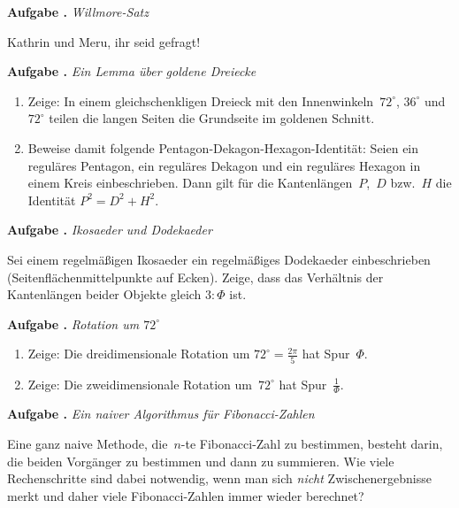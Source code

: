 \documentclass[a4paper,ngerman]{scrartcl}
\newlength{\aufgabenskip}
\newcounter{aufgabennummer}
\newenvironment{aufgabe}[1]{
  \addtocounter{aufgabennummer}{1}
  \textbf{Aufgabe \theaufgabennummer.} \emph{#1} \par
}{\vspace{\aufgabenskip}}
\begin{document}
\begin{aufgabe}{Willmore-Satz}
Kathrin und Meru, ihr seid gefragt!
\end{aufgabe}

\begin{aufgabe}{Ein Lemma über goldene Dreiecke}
\begin{enumerate}
\item Zeige: In einem gleichschenkligen Dreieck mit den
Innenwinkeln~$72^\circ$, $36^\circ$ und~$72^\circ$ teilen die langen Seiten die
Grundseite im goldenen Schnitt.
\item Beweise damit folgende Pentagon-Dekagon-Hexagon-Identität: Seien ein
reguläres Pentagon, ein reguläres Dekagon und ein reguläres Hexagon in einem
Kreis einbeschrieben. Dann gilt für die Kantenlängen~$P$,~$D$ bzw.~$H$ die
Identität $P^2 = D^2 + H^2$.
\end{enumerate}
\end{aufgabe}

\begin{aufgabe}{Ikosaeder und Dodekaeder}
Sei einem regelmäßigen Ikosaeder ein regelmäßiges Dodekaeder einbeschrieben
(Seitenflächenmittelpunkte auf Ecken). Zeige, dass das Verhältnis der Kantenlängen
beider Objekte gleich $3:\Phi$ ist.
\end{aufgabe}

\begin{aufgabe}{Rotation um $72^\circ$}
\begin{enumerate}
\item Zeige: Die dreidimensionale Rotation um $72^\circ = \frac{2\pi}{5}$ hat Spur~$\Phi$.
\item Zeige: Die zweidimensionale Rotation um~$72^\circ$ hat Spur~$\frac{1}{\Phi}$.
\end{enumerate}
\end{aufgabe}

\begin{aufgabe}{Ein naiver Algorithmus für Fibonacci-Zahlen}
Eine ganz naive Methode, die~$n$-te Fibonacci-Zahl zu bestimmen, besteht
darin, die beiden Vorgänger zu bestimmen und dann zu summieren. Wie viele
Rechenschritte sind dabei notwendig, wenn man sich \emph{nicht}
Zwischenergebnisse merkt und daher viele Fibonacci-Zahlen immer wieder
berechnet?
\end{aufgabe}
\end{document}
